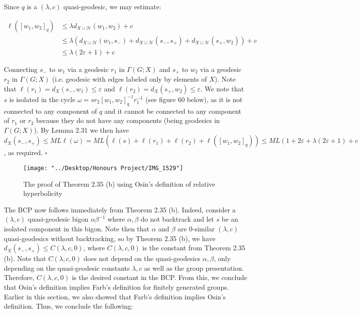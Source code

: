 \documentclass[12pt]{article}
\begin{document}
	Since $q$ is a $(\lambda, c)$ quasi-geodesic, we may estimate: 
	
	\begin{align*}
	\ell([w_1, w_2]_{q}) &\leq \lambda d_{X \cup \mathcal{H}}(w_1, w_2) + c \\
	&\leq \lambda (d_{X \cup \mathcal{H}}(w_1, s_-) + d_{X \cup \mathcal{H}}(s_-, s_+) + d_{X \cup \mathcal{H}}(s_+, w_2)) + c \\
	&\leq \lambda(2 \varepsilon + 1) + c
	\end{align*}
	
	Connecting $s_-$ to $w_1$ via a geodesic $r_1$ in $\Gamma(G;X)$ and $s_+$ to $w_2$ via a geodesic $r_2$ in $\Gamma(G;X)$ (i.e. geodesic with edges labeled only by elements of $X$). Note that $\ell(r_1) = d_X(s_-, w_1) \leq \varepsilon$ and $\ell(r_2) = d_X(s_+, w_2) \leq \varepsilon$. We note that $s$ is isolated in the cycle $\omega = sr_2 [w_1, w_2]_q^{-1} r_1^{-1}$ (see figure 60 below), as it is not connected to any component of $q$ and it cannot be connected to any component of $r_1$ or $r_2$ because they do not have any components (being geodesics in $\Gamma(G;X)$). By Lemma 2.31 we then have $d_X(s_-, s_+) \leq ML \ell(\omega) = ML (\ell(s) + \ell(r_1) + \ell(r_2) + \ell([w_1, w_2]_q)) \leq ML(1 + 2 \varepsilon + \lambda(2 \varepsilon + 1) + c) = C$, as required.  $\square$
	
	
\begin{figure} [H]
	\centering
	\texttt{[image: "../Desktop/Honours Project/IMG\_1529"]}
	\caption{The proof of Theorem 2.35 (b) using Osin's definition of relative hyperbolicity}
	\label{fig:img1529}
\end{figure}
	
	The BCP now follows immediately from Theorem 2.35 (b). Indeed, consider a $(\lambda, c)$ quasi-geodesic bigon $\alpha \beta^{-1}$ where $\alpha, \beta$ do not backtrack and let $s$ be an isolated component in this bigon. Note then that $\alpha$ and $\beta$ are 0-similar $(\lambda, c)$ quasi-geodesics without backtracking, so by Theorem 2.35 (b), we have $d_X(s_-, s_+) \leq C(\lambda, c, 0)$, where $C(\lambda, c, 0)$ is the constant from Theorem 2.35 (b). Note that $C(\lambda, c, 0)$ does not depend on the quasi-geodesics $\alpha, \beta$, only depending on the quasi-geodesic constants $\lambda, c$ as well as the group presentation. Therefore, $C(\lambda, c, 0)$ is the desired constant in the BCP. From this, we conclude that Osin's definition implies Farb's definition for finitely generated groups. Earlier in this section, we also showed that Farb's definition implies Osin's definition. Thus, we conclude the following: 
	
\end{document}
